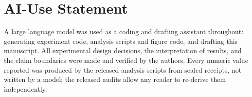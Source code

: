 \documentclass{article}
\begin{document}
\section*{AI-Use Statement}

A large language model was used as a coding and drafting assistant throughout:
generating experiment code, analysis scripts and figure code, and drafting this
manuscript. All experimental design decisions, the interpretation of results,
and the claim boundaries were made and verified by the authors. Every numeric
value reported was produced by the released analysis scripts from sealed
receipts, not written by a model; the released audits allow any reader to
re-derive them independently.



\end{document}
